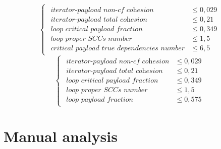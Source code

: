 \begin{equation*}
\begin{cases}
\begin{aligned}
\textit{iterator-payload non-cf cohesion}            &\le 0,029 \\[1ex]
\textit{iterator-payload total cohesion} &\leq 0,21 \\[1ex]
\textit{loop critical payload fraction} &\leq 0,349 \\[1ex]
\textit{loop proper SCCs number} &\leq 1,5 \\[1ex]
\textit{critical payload true dependencies number} &\leq 6,5
\end{aligned}
\end{cases}
\end{equation*}\newline
\begin{equation*}
\begin{cases}
\begin{aligned}
\textit{iterator-payload non-cf cohesion}            &\le 0,029 \\[1ex]
\textit{iterator-payload total cohesion} &\leq 0,21 \\[1ex]
\textit{loop critical payload fraction} &\leq 0,349 \\[1ex]
\textit{loop proper SCCs number} &\leq 1,5 \\[1ex]
\textit{loop payload fraction} &\leq 0,575
\end{aligned}
\end{cases}
\end{equation*}\newline
    

\section{Manual analysis}
\label{analysis-manual-analysis}
